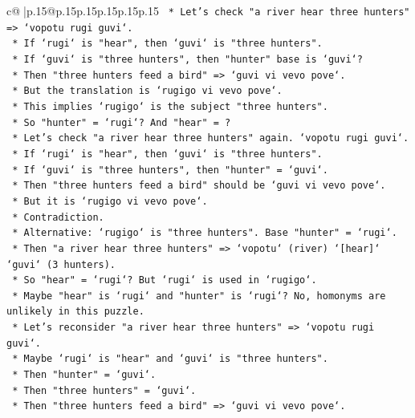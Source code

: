 \documentclass{article}
\begin{document}
{\begin{supertabular}{c@{$\;$}|p{.15\linewidth}@{}p{.15\linewidth}p{.15\linewidth}p{.15\linewidth}p{.15\linewidth}p{.15\linewidth}}
{{{\texttt{        *   Let's check "a river hear three hunters" => `vopotu rugi guvi`.} \\
\texttt{            *   If `rugi` is "hear", then `guvi` is "three hunters".} \\
\texttt{            *   If `guvi` is "three hunters", then "hunter" base is `guvi`?} \\
\texttt{            *   Then "three hunters feed a bird" => `guvi vi vevo pove`.} \\
\texttt{            *   But the translation is `rugigo vi vevo pove`.} \\
\texttt{            *   This implies `rugigo` is the subject "three hunters".} \\
\texttt{            *   So "hunter" = `rugi`? And "hear" = ?} \\
\texttt{            *   Let's check "a river hear three hunters" again. `vopotu rugi guvi`.} \\
\texttt{            *   If `rugi` is "hear", then `guvi` is "three hunters".} \\
\texttt{            *   If `guvi` is "three hunters", then "hunter" = `guvi`.} \\
\texttt{            *   Then "three hunters feed a bird" should be `guvi vi vevo pove`.} \\
\texttt{            *   But it is `rugigo vi vevo pove`.} \\
\texttt{            *   Contradiction.} \\
\texttt{            *   Alternative: `rugigo` is "three hunters". Base "hunter" = `rugi`.} \\
\texttt{            *   Then "a river hear three hunters" => `vopotu` (river) `{[}hear{]}` `guvi` (3 hunters).} \\
\texttt{            *   So "hear" = `rugi`? But `rugi` is used in `rugigo`.} \\
\texttt{            *   Maybe "hear" is `rugi` and "hunter" is `rugi`? No, homonyms are unlikely in this puzzle.} \\
\texttt{            *   Let's reconsider "a river hear three hunters" => `vopotu rugi guvi`.} \\
\texttt{                *   Maybe `rugi` is "hear" and `guvi` is "three hunters".} \\
\texttt{                *   Then "hunter" = `guvi`.} \\
\texttt{                *   Then "three hunters" = `guvi`.} \\
\texttt{                *   Then "three hunters feed a bird" => `guvi vi vevo pove`.} \\
}}}
\end{supertabular}}
\end{document}
